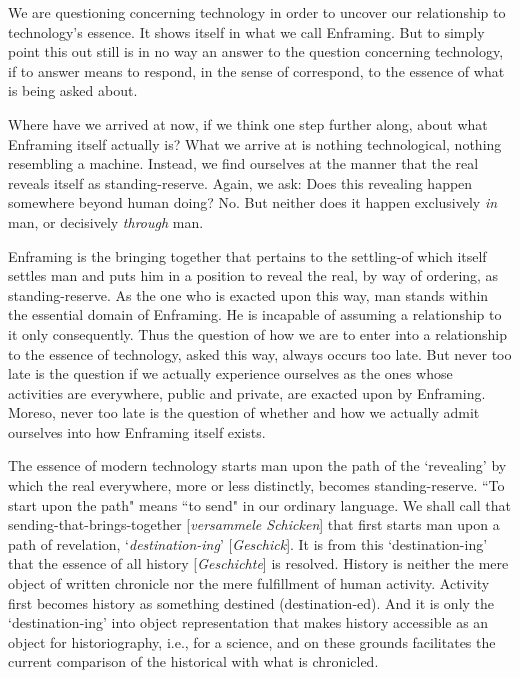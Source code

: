 \documentclass[12pt]{article}
\begin{document}
We are questioning concerning technology in order to uncover our relationship to technology's essence. It shows itself in what we call Enframing. But to simply point this out still is in no way an answer to the question concerning technology, if to answer means to respond, in the sense of correspond, to the essence of what is being asked about.

Where have we arrived at now, if we think one step further along, about what Enframing itself actually is? What we arrive at is nothing technological, nothing resembling a machine. Instead, we find ourselves at the manner that the real reveals itself as standing-reserve. Again, we ask: Does this revealing happen somewhere beyond human doing? No. But neither does it happen exclusively \textit{in} man, or decisively \textit{through} man.

Enframing is the bringing together that pertains to the settling-of which itself settles man and puts him in a position to reveal the real, by way of ordering, as standing-reserve. As the one who is exacted upon this way, man stands within the essential domain of Enframing. He is incapable of assuming a relationship to it only consequently. Thus the question of how we are to enter into a relationship to the essence of technology, asked this way, always occurs too late. But never too late is the question if we actually experience ourselves as the ones whose activities are everywhere, public and private, are exacted upon by Enframing. Moreso, never too late is the question of whether and how we actually admit ourselves into how Enframing itself exists.

The essence of modern technology starts man upon the path of the `revealing' by which the real everywhere, more or less distinctly, becomes standing-reserve. ``To start upon the path" means ``to send" in our ordinary language. We shall call that sending-that-brings-together [\textit{versammele Schicken}] that first starts man upon a path of revelation, `\textit{destination-ing}' [\textit{Geschick}]. It is from this `destination-ing' that the essence of all history [\textit{Geschichte}] is resolved. History is neither the mere object of written chronicle nor the mere fulfillment of human activity. Activity first becomes history as something destined (destination-ed). And it is only the `destination-ing' into object representation that makes history accessible as an object for historiography, i.e., for a science, and on these grounds facilitates the current comparison of the historical with what is chronicled.
\end{document}
